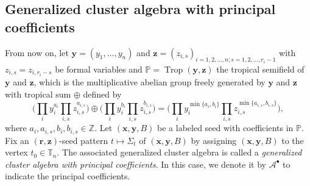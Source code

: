 \documentclass[pdftex]{sigma}
\newcommand{\Z}{\mathbb{Z}}
\numberwithin{equation}{section}
\begin{document}
\subsection{Generalized cluster algebra with principal coefficients}\label{ss:principal-gca}

From now on, let $\mathbf{y}=(y_1,\dots, y_n)$ and $\mathbf{z}=(z_{i,s})_{i=1,2,\dots,n;s=1,2,\dots,r_i-1}$ with $z_{i,s}=z_{i,r_{i}-s}$ be formal variables and $\mathbb{P}=\operatorname{Trop}(\mathbf{y},\mathbf{z})$ the tropical semifield of $\mathbf{y}$ and $\mathbf{z}$, which is the multiplicative abelian group freely
generated by $\mathbf{y}$ and $\mathbf{z}$ with tropical sum $\oplus$ defined by
\begin{equation*}
\biggl(\prod\limits_{i}y_i^{a_i}\prod\limits_{i,s}z_{i,s}^{a_{i,s}}\biggr)\oplus\biggl(\prod\limits_{i}y_i^{b_i}\prod\limits_{i,s}z_{i,s}^{b_{i,s}}\biggr)=\biggl(\prod\limits_{i}y_i^{\min\{a_i,b_i\}}\prod\limits_{i,s}z_{i,s}^{\min\{a_{i,s},b_{i,s}\}}\biggr),
\end{equation*}
where $a_i,a_{i,s},b_i,b_{i,s}\in \Z$. Let $(\mathbf{x},\mathbf{y}, B)$ be a labeled seed with coefficients in $\mathbb{P}$. Fix an $(\mathbf{r},\mathbf{z})$-seed pattern $t\mapsto \Sigma_t$ of $(\mathbf{x},\mathbf{y}, B)$ by assigning $(\mathbf{x},\mathbf{y}, B)$ to the vertex $t_0\in \mathbb{T}_n$. The associated generalized cluster algebra is called a {\it generalized cluster algebra with principal coefficients}. In this case, we denote it by $\mathcal{A}^\bullet$ to indicate the principal coefficients.
\end{document}
